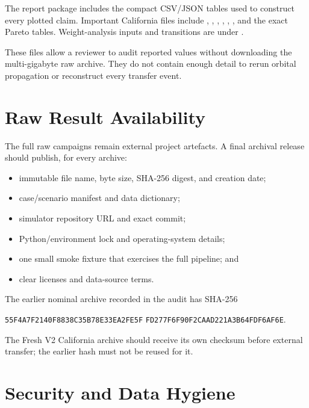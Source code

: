 The report package includes the compact CSV/JSON tables used to construct every plotted claim. Important California files include , , , , , , and the exact Pareto tables. Weight-analysis inputs and transitions are under .

These files allow a reviewer to audit reported values without downloading the multi-gigabyte raw archive. They do not contain enough detail to rerun orbital propagation or reconstruct every transfer event.

\section{Raw Result Availability}

The full raw campaigns remain external project artefacts. A final archival release should publish, for every archive:

\begin{itemize}
\item immutable file name, byte size, SHA-256 digest, and creation date;
\item case/scenario manifest and data dictionary;
\item simulator repository URL and exact commit;
\item Python/environment lock and operating-system details;
\item one small smoke fixture that exercises the full pipeline; and
\item clear licenses and data-source terms.
\end{itemize}

The earlier nominal archive recorded in the audit has SHA-256

\begin{center}
\small\texttt{55F4A7F2140F8838C35B78E33EA2FE5F}\newline
\texttt{FD277F6F90F2CAAD221A3B64FDF6AF6E}.
\end{center}

The Fresh V2 California archive should receive its own checksum before external transfer; the earlier hash must not be reused for it.

\section{Security and Data Hygiene}

